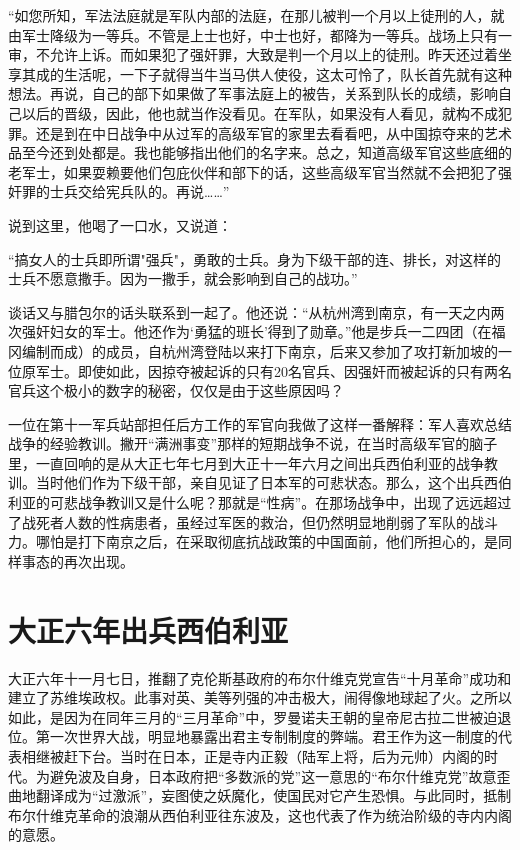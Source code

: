 \documentclass[12pt,UTF8]{ctexbook}
\begin{document}
“如您所知，军法法庭就是军队内部的法庭，在那儿被判一个月以上徒刑的人，就由军士降级为一等兵。不管是上士也好，中士也好，都降为一等兵。战场上只有一审，不允许上诉。而如果犯了强奸罪，大致是判一个月以上的徒刑。昨天还过着坐享其成的生活呢，一下子就得当牛当马供人使役，这太可怜了，队长首先就有这种想法。再说，自己的部下如果做了军事法庭上的被告，关系到队长的成绩，影响自己以后的晋级，因此，他也就当作没看见。在军队，如果没有人看见，就构不成犯罪。还是到在中日战争中从过军的高级军官的家里去看看吧，从中国掠夺来的艺术品至今还到处都是。我也能够指出他们的名字来。总之，知道高级军官这些底细的老军士，如果耍赖要他们包庇伙伴和部下的话，这些高级军官当然就不会把犯了强奸罪的士兵交给宪兵队的。再说……”

说到这里，他喝了一口水，又说道：

“搞女人的士兵即所谓"强兵"，勇敢的士兵。身为下级干部的连、排长，对这样的士兵不愿意撒手。因为一撒手，就会影响到自己的战功。”

谈话又与腊包尔的话头联系到一起了。他还说：“从杭州湾到南京，有一天之内两次强奸妇女的军士。他还作为‘勇猛的班长’得到了勋章。”他是步兵一二四团（在福冈编制而成）的成员，自杭州湾登陆以来打下南京，后来又参加了攻打新加坡的一位原军士。即使如此，因掠夺被起诉的只有20名官兵、因强奸而被起诉的只有两名官兵这个极小的数字的秘密，仅仅是由于这些原因吗？

一位在第十一军兵站部担任后方工作的军官向我做了这样一番解释：军人喜欢总结战争的经验教训。撇开“满洲事变”那样的短期战争不说，在当时高级军官的脑子里，一直回响的是从大正七年七月到大正十一年六月之间出兵西伯利亚的战争教训。当时他们作为下级干部，亲自见证了日本军的可悲状态。那么，这个出兵西伯利亚的可悲战争教训又是什么呢？那就是“性病”。在那场战争中，出现了远远超过了战死者人数的性病患者，虽经过军医的救治，但仍然明显地削弱了军队的战斗力。哪怕是打下南京之后，在采取彻底抗战政策的中国面前，他们所担心的，是同样事态的再次出现。

\section{大正六年出兵西伯利亚}

大正六年十一月七日，推翻了克伦斯基政府的布尔什维克党宣告“十月革命”成功和建立了苏维埃政权。此事对英、美等列强的冲击极大，闹得像地球起了火。之所以如此，是因为在同年三月的“三月革命”中，罗曼诺夫王朝的皇帝尼古拉二世被迫退位。第一次世界大战，明显地暴露出君主专制制度的弊端。君王作为这一制度的代表相继被赶下台。当时在日本，正是寺内正毅（陆军上将，后为元帅）内阁的时代。为避免波及自身，日本政府把“多数派的党”这一意思的“布尔什维克党”故意歪曲地翻译成为“过激派”，妄图使之妖魔化，使国民对它产生恐惧。与此同时，抵制布尔什维克革命的浪潮从西伯利亚往东波及，这也代表了作为统治阶级的寺内内阁的意愿。
\end{document}
